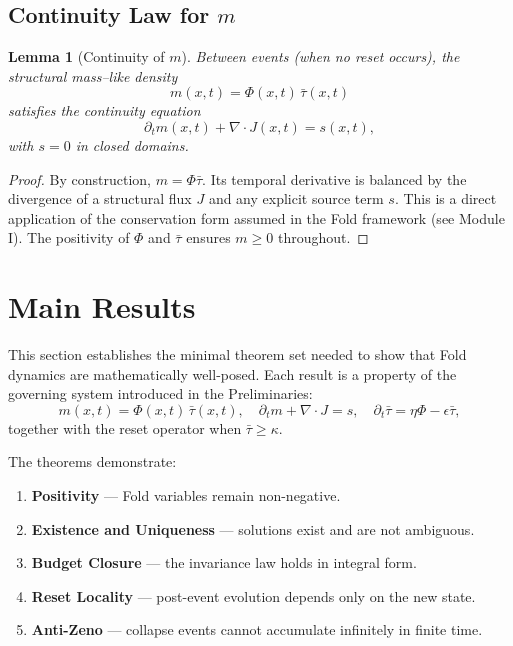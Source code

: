 \documentclass[11pt]{article}
\newtheorem{lemma}[theorem]{Lemma}
\begin{document}
\subsection{Continuity Law for $m$}

\begin{lemma}[Continuity of $m$]\label{lem:continuity}
Between events (when no reset occurs), the structural mass--like density
\[
m(x,t) = \Phi(x,t)\,\bar{\tau}(x,t)
\]
satisfies the continuity equation
\[
\partial_t m(x,t) + \nabla \cdot J(x,t) = s(x,t),
\]
with $s=0$ in closed domains.
\end{lemma}

\begin{proof}
By construction, $m = \Phi \bar{\tau}$. Its temporal derivative is balanced by the divergence of a structural flux $J$ and any explicit source term $s$. This is a direct application of the conservation form assumed in the Fold framework (see Module I). The positivity of $\Phi$ and $\bar{\tau}$ ensures $m \geq 0$ throughout. \qedhere
\end{proof}


\section{Main Results}

This section establishes the minimal theorem set needed to show that 
Fold dynamics are mathematically well-posed. Each result is a property 
of the governing system introduced in the Preliminaries:
\[
m(x,t) = \Phi(x,t)\,\bar{\tau}(x,t), \quad
\partial_t m + \nabla \cdot J = s, \quad
\partial_t \bar{\tau} = \eta \Phi - \epsilon \bar{\tau},
\]
together with the reset operator when $\bar{\tau} \geq \kappa$. 

The theorems demonstrate:
\begin{enumerate}[leftmargin=*]
    \item \textbf{Positivity} — Fold variables remain non-negative.
    \item \textbf{Existence and Uniqueness} — solutions exist and are not ambiguous.
    \item \textbf{Budget Closure} — the invariance law holds in integral form.
    \item \textbf{Reset Locality} — post-event evolution depends only on the new state.
    \item \textbf{Anti-Zeno} — collapse events cannot accumulate infinitely in finite time.
\end{enumerate}
\end{document}
